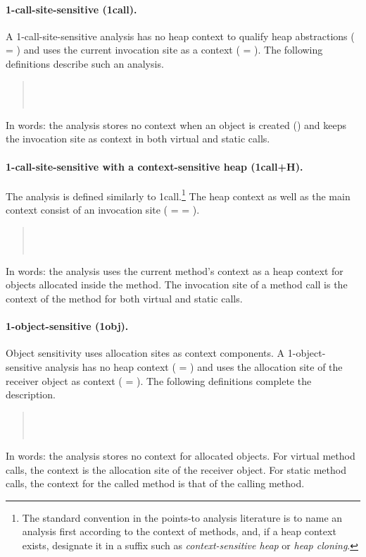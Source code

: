\paragraph{1-call-site-sensitive (1call).}
A 1-call-site-sensitive analysis has no heap context to qualify heap
abstractions ( = \args{\{$\star$\}}) and uses the current
invocation site as a context ( = ). The following
definitions describe such an analysis.
\begin{quote}
 \\
 \\
\end{quote}
In words: the analysis stores no context when an object is created
() and keeps the invocation site as context in
both virtual and static calls.

\paragraph{1-call-site-sensitive with a context-sensitive
heap (1call+H).} The analysis is defined similarly to
1call.\footnote{The standard convention in the points-to analysis
literature is to name an analysis first according to the context of
methods, and, if a heap context exists, designate it in a suffix such
as \emph{context-sensitive heap} or \emph{heap cloning}.}  The heap
context as well as the main context consist of an invocation site
( =  = ).
\begin{quote}
 \\
 \\
\end{quote}
In words: the analysis uses the current method's context as a heap
context for objects allocated inside the method. The invocation site
of a method call is the context of the method for both virtual and
static calls.

\paragraph{1-object-sensitive (1obj).}
Object sensitivity uses allocation sites as context components. A
1-object-sensitive analysis has no heap context ( =
\args{\{$\star$\}}) and uses the allocation site of the receiver
object as context ( = ). The following definitions
complete the description. 
\begin{quote}
 \\
 \\
\end{quote}
In words: the analysis stores no context for allocated objects. For
virtual method calls, the context is the allocation site of the
receiver object. For static method calls, the context for the called
method is that of the calling method.

